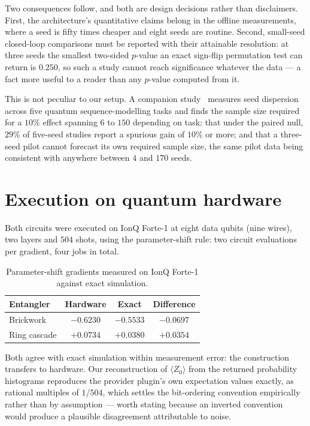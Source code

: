 \documentclass[11pt,onecolumn]{article}
\begin{document}
Two consequences follow, and both are design decisions rather than
disclaimers. First, the architecture's quantitative claims belong in the
offline measurements, where a seed is fifty times cheaper and eight
seeds are routine. Second, small-seed closed-loop comparisons must be
reported with their attainable resolution: at three seeds the smallest
two-sided $p$-value an exact sign-flip permutation test can return is
$0.250$, so such a study cannot reach significance whatever the data ---
a fact more useful to a reader than any $p$-value computed from it.

This is not peculiar to our setup. A companion study~\cite{papera}
measures seed dispersion across five quantum sequence-modelling tasks
and finds the sample size required for a $10\%$ effect spanning $6$ to
$150$ depending on task; that under the paired null, $29\%$ of
five-seed studies report a spurious gain of $10\%$ or more; and that a
three-seed pilot cannot forecast its own required sample size, the same
pilot data being consistent with anywhere between $4$ and $170$ seeds.

\section{Execution on quantum hardware}\label{sec:hardware}
Both circuits were executed on IonQ Forte-1 at eight data qubits (nine
wires), two layers and $504$ shots, using the parameter-shift rule: two
circuit evaluations per gradient, four jobs in total.

\begin{table}[htb]\centering\small
\caption{Parameter-shift gradients measured on IonQ Forte-1 against
exact simulation.}
\begin{tabular}{lccc}
\toprule
Entangler & Hardware & Exact & Difference \\
\midrule
Brickwork    & $-0.6230$ & $-0.5533$ & $-0.0697$ \\
Ring cascade & $+0.0734$ & $+0.0380$ & $+0.0354$ \\
\bottomrule
\end{tabular}
\end{table}

Both agree with exact simulation within measurement error: the
construction transfers to hardware. Our reconstruction of
$\langle Z_0 \rangle$ from the returned probability histograms
reproduces the provider plugin's own expectation values exactly, as
rational multiples of $1/504$, which settles the bit-ordering convention
empirically rather than by assumption --- worth stating because an
inverted convention would produce a plausible disagreement attributable
to noise.
\end{document}
